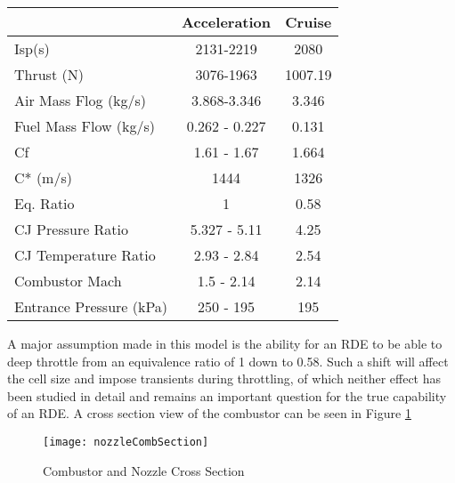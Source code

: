 \begin{center}
\begin{tabular}{l c c}
& Acceleration & Cruise \\
\hline
Isp(s) & 2131-2219 & 2080 \\
Thrust (N) & 3076-1963 & 1007.19 \\
Air Mass Flog (kg/s) & 3.868-3.346 & 3.346 \\
Fuel Mass Flow (kg/s) & 0.262 - 0.227 & 0.131 \\
Cf & 1.61 - 1.67 & 1.664 \\
C* (m/s) & 1444 & 1326 \\
Eq. Ratio & 1 & 0.58 \\
CJ Pressure Ratio & 5.327 - 5.11 & 4.25 \\
CJ Temperature Ratio & 2.93 - 2.84 & 2.54 \\
Combustor Mach & 1.5 - 2.14 & 2.14 \\
Entrance Pressure (kPa) & 250 - 195 & 195
\end{tabular}
\end{center}

    A major assumption made in this model is the ability for an RDE to be able to deep throttle from an equivalence ratio of 1 down to 0.58. Such a shift will affect the cell size and impose transients during throttling, of which neither effect has been studied in detail and remains an important question for the true capability of an RDE. A cross section view of the combustor can be seen in Figure \ref{fig:nozzleCombSection}
    
 \begin{figure}[H]
\begin{center}
\texttt{[image: nozzleCombSection]}
\caption{Combustor and Nozzle Cross Section}
\label{fig:nozzleCombSection}
\end{center}
\end{figure}
